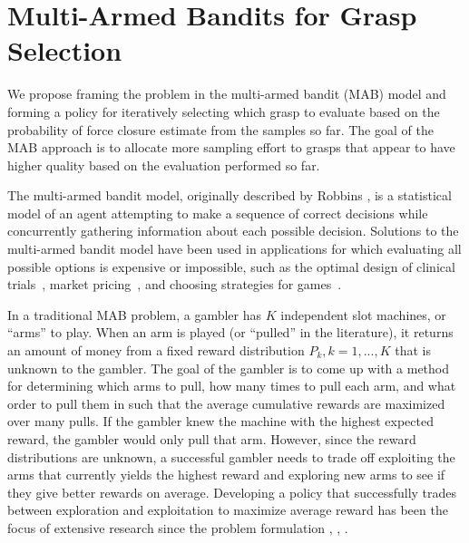 \documentclass[journal,transmag]{IEEEtran}%
\begin{document}
\section{Multi-Armed Bandits for Grasp Selection}
We propose framing the problem in the multi-armed bandit (MAB) model and forming a policy for iteratively selecting which grasp to evaluate based on the probability of force closure estimate from the samples so far.
The goal of the MAB approach is to allocate more sampling effort to grasps that appear to have higher quality based on the evaluation performed so far.

The multi-armed bandit model, originally described by Robbins \cite{robbins1985some}, is a statistical model of an agent attempting to make a sequence of correct decisions while concurrently gathering information about each possible decision.
Solutions to the multi-armed bandit model have been used in applications for which evaluating all possible options is expensive or impossible, such as the optimal design of clinical trials~\cite{simon1989optimal}, market pricing~\cite{rothschild1974two}, and choosing strategies for games~\cite{st2012online}. 

In a traditional MAB problem, a gambler has $K$ independent slot machines, or ``arms'' to play.
When an arm is played (or ``pulled'' in the literature), it returns an amount of money from a fixed reward distribution $P_k, k = 1, ..., K$ that is unknown to the gambler.
The goal of the gambler is to come up with a method for determining which arms to pull, how many times to pull each arm, and what order to pull them in such that the average cumulative rewards are maximized over many pulls.
If the gambler knew the machine with the highest expected reward, the gambler would only pull that arm.
However, since the reward distributions are unknown, a successful gambler needs to trade off exploiting the arms that currently yields the highest reward and exploring new arms to see if they give better rewards on average.
Developing a policy that successfully trades between exploration and exploitation to maximize average reward has been the focus of extensive research since the problem formulation \cite{bubeck2009pure}, \cite{robbins1985some}, \cite{bergemann2006bandit}.
\end{document}
